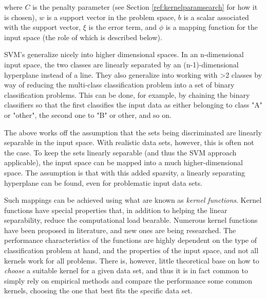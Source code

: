 \documentclass{netsec2012}
\begin{document}
where $C$ is the penalty parameter (see Section \ref{ref:kernelparamsearch} for how it is chosen),
$w$ is a support vector in the problem space, $b$ is a scalar associated with the support vector,
$\xi$ is the error term, and $\phi$ is a mapping function for the input space (the role of which is
described below). \cite{libsvm_guide,cortes1995support}

\label{ref:multiclasssvm}

SVM's generalize nicely into higher dimensional spaces.  In an n-dimensional input space, the two
classes are linearly separated by an (n-1)-dimensional hyperplane instead of a line.  They also
generalize into working with >2 classes by way of reducing the multi-class classification problem
into a set of binary classification problems.  This can be done, for example, by chaining the binary
classifiers so that the first classifies the input data as either belonging to class "A" or "other",
the second one to "B" or other, and so on. \cite{duan2005best}

The above works off the assumption that the sets being discriminated are linearly separable in the
input space.  With realistic data sets, however, this is often not the case.  To keep the sets
linearly separable (and thus the SVM approach applicable), the input space can be mapped into a much
higher-dimensional space.  The assumption is that with this added sparsity, a linearly separating
hyperplane can be found, even for problematic input data sets. \cite{svm_chemistry}

Such mappings can be achieved using what are known as \emph{kernel functions}.  Kernel functions
have special properties that, in addition to helping the linear separability, reduce the
computational load bearable.  Numerous kernel functions have been proposed in literature, and new
ones are being researched.  The performance characteristics of the functions are highly dependent on
the type of classification problem at hand, and the properties of the input space, and not all
kernels work for all problems.  There is, however, little theoretical base on how to \emph{choose} a
suitable kernel for a given data set, and thus it is in fact common to simply rely on empirical
methods and compare the performance some common kernels, choosing the one that best fits the
specific data set. \cite{svm_chemistry}

%
%
%
\end{document}
